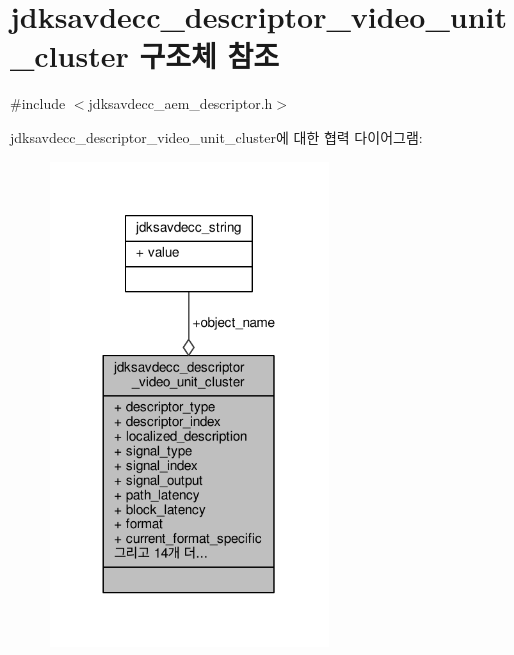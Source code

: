 \hypertarget{structjdksavdecc__descriptor__video__unit__cluster}{}\section{jdksavdecc\+\_\+descriptor\+\_\+video\+\_\+unit\+\_\+cluster 구조체 참조}
\label{structjdksavdecc__descriptor__video__unit__cluster}


{\ttfamily \#include $<$jdksavdecc\+\_\+aem\+\_\+descriptor.\+h$>$}



jdksavdecc\+\_\+descriptor\+\_\+video\+\_\+unit\+\_\+cluster에 대한 협력 다이어그램\+:
\nopagebreak
\begin{figure}[H]
\begin{center}
\leavevmode
\includegraphics[width=209pt]{structjdksavdecc__descriptor__video__unit__cluster__coll__graph}
\end{center}
\end{figure}
